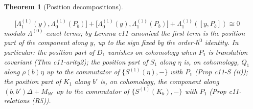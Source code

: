 \documentclass[11pt]{article}
\numberwithin{equation}{section}
\theoremstyle{plain}
\newtheorem{theorem}{Theorem}[section]
\theoremstyle{definition}
\begin{document}
\begin{theorem}[Position decompositions]
\begin{itemize}
\begin{equation}
\big[\Lambda^{(1)}_1(y),\Lambda^{(1)}_0(P_b)\big]+\big[\Lambda^{(1)}_0(y),\Lambda^{(1)}_1(P_b)\big]+\Lambda^{(1)}_1([y,P_b])\cong0
\label{eq:op-poscoh}
\end{equation}
modulo $\Lambda^{(0)}$-exact terms; by Lemma c11-canonical the first term is the position part of the component along $y$, up to the sign fixed by the order-$\hbar^0$ identity. In particular: the position part of $D_1$ vanishes on cohomology when $P_1$ is translation covariant (Thm c11-arity2); the position part of $S_1$ along $\eta$ is, on cohomology, $Q_1$ along $\rho(b)\eta$ up to the commutator of $\{S^{(1)}(\eta),-\}$ with $P_1$ (Prop c11-S (ii)); the position part of $K_1$ along $b'$ is, on cohomology, the component along $(b,b')\Delta+M_{bb'}$ up to the commutator of $\{S^{(1)}(K_b),-\}$ with $P_1$ (Prop c11-relations (R5)).
\end{itemize}
\end{theorem}
\end{document}
